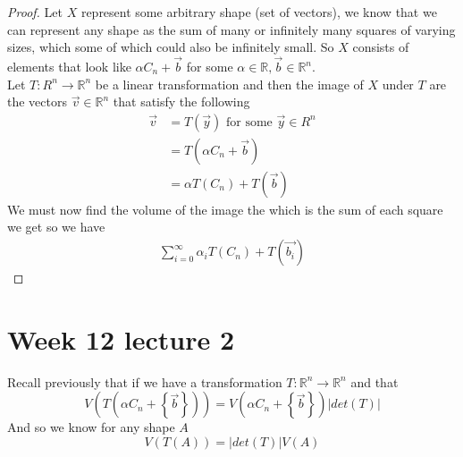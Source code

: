 \documentclass[11pt]{book}
\begin{document}
\begin{proof}
    Let $X$ represent some arbitrary shape (set of vectors), we know that we can represent any shape as the sum of many or infinitely many squares of varying sizes, which some of which could also be infinitely small. So $X$ consists of elements that look like $\alpha C_{n}  + \vec{b} $ for some $\alpha \in \mathbb{R} , \vec{b} \in \mathbb{R} ^{n} $. \\
    Let $T : R^{n}  \to \mathbb{R} ^{n}  $ be a linear transformation and then the image of $X$ under $T$ are the vectors $\vec{v} \in \mathbb{R} ^{n} $ that satisfy the following
    \begin{align*}
        \vec{v} &= T\left(\vec{y} \right) \text{ for some  } \vec{y} \in R^{n} \\
        &= T\left(\alpha C_{n}  + \vec{b} \right)   \\ 
        &= \alpha T\left(C_{n} \right)  + T\left(\vec{b} \right)  
    \end{align*}
    We must now find the volume of the image the which is the sum of each square we get so we have
    \begin{align*}
        \sum_{i=0}^{\infty } \alpha _{i} T\left(C_{n} \right)  + T\left(\vec{b_{i} } \right)  
    \end{align*}
\end{proof}

\section{Week 12 lecture 2}%
\label{chp:week_12_lecture_2}

Recall previously that if we have a transformation $T : \mathbb{R} ^{n}  \to \mathbb{R} ^{n}  $ and that 
\[
V\left(T\left(\alpha C_{n}  + \left\{ \vec{b}  \right\} \right) \right) = V\left(\alpha C_{n}  + \left\{ \vec{b}  \right\} \right) \left| \mathit{det} \left(T\right)  \right| 
\]
And so we know for any shape $A$ 
\[
V\left(T\left(A\right) \right) = \left| \mathit{det} \left(T\right)  \right| V\left(A\right) 
\]
\end{document}
